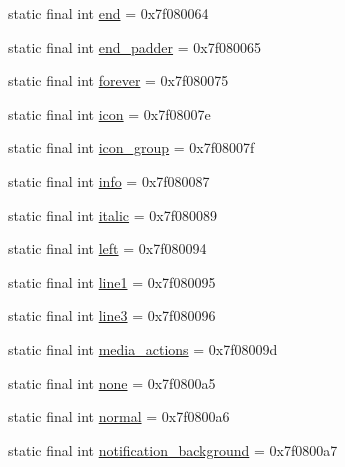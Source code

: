 \begin{DoxyCompactItemize}
\item 
static final int \mbox{\hyperlink{classcom_1_1jjoe64_1_1graphview_1_1_r_1_1id_adef14f765dfbd31741ad77ad9536a4ec}{end}} = 0x7f080064
\item 
static final int \mbox{\hyperlink{classcom_1_1jjoe64_1_1graphview_1_1_r_1_1id_a58e7cf8b6c56ff515cb712c127eb3e9e}{end\+\_\+padder}} = 0x7f080065
\item 
static final int \mbox{\hyperlink{classcom_1_1jjoe64_1_1graphview_1_1_r_1_1id_ac31634a56b74d12bafdc49f1a5fe0c51}{forever}} = 0x7f080075
\item 
static final int \mbox{\hyperlink{classcom_1_1jjoe64_1_1graphview_1_1_r_1_1id_aee07149d423ef66f7a0444fd70b0d257}{icon}} = 0x7f08007e
\item 
static final int \mbox{\hyperlink{classcom_1_1jjoe64_1_1graphview_1_1_r_1_1id_a13986a9d3064611f2010daa16748f3c6}{icon\+\_\+group}} = 0x7f08007f
\item 
static final int \mbox{\hyperlink{classcom_1_1jjoe64_1_1graphview_1_1_r_1_1id_ab2a21f951f861d3e6790a0485182c0ba}{info}} = 0x7f080087
\item 
static final int \mbox{\hyperlink{classcom_1_1jjoe64_1_1graphview_1_1_r_1_1id_ad694c53b33297b3c0d6be35cb0b7bb50}{italic}} = 0x7f080089
\item 
static final int \mbox{\hyperlink{classcom_1_1jjoe64_1_1graphview_1_1_r_1_1id_ab391314a185866a775011eb2d165f741}{left}} = 0x7f080094
\item 
static final int \mbox{\hyperlink{classcom_1_1jjoe64_1_1graphview_1_1_r_1_1id_ada73f9f742e87c7ff557931f04a5c1dd}{line1}} = 0x7f080095
\item 
static final int \mbox{\hyperlink{classcom_1_1jjoe64_1_1graphview_1_1_r_1_1id_a26942ee280f420a3d299113d1dacac10}{line3}} = 0x7f080096
\item 
static final int \mbox{\hyperlink{classcom_1_1jjoe64_1_1graphview_1_1_r_1_1id_a75e2ad44ed6f847731dcfac19125168d}{media\+\_\+actions}} = 0x7f08009d
\item 
static final int \mbox{\hyperlink{classcom_1_1jjoe64_1_1graphview_1_1_r_1_1id_a98590432f732d45608f770e502e0b6c0}{none}} = 0x7f0800a5
\item 
static final int \mbox{\hyperlink{classcom_1_1jjoe64_1_1graphview_1_1_r_1_1id_a5b9e81767b64ecd7e71d9ab15ce1547a}{normal}} = 0x7f0800a6
\item 
static final int \mbox{\hyperlink{classcom_1_1jjoe64_1_1graphview_1_1_r_1_1id_af17e5c1a7951771f338037f1cfeaf116}{notification\+\_\+background}} = 0x7f0800a7
\item 

\end{DoxyCompactItemize}
